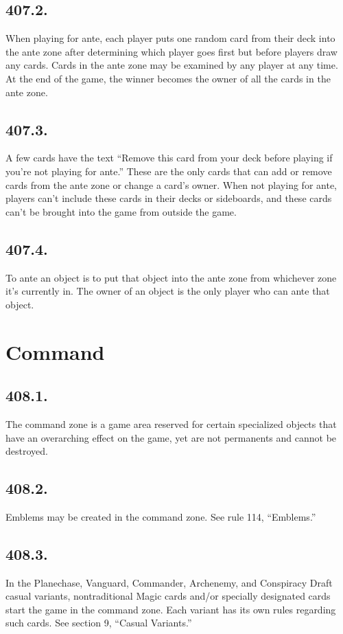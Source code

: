 \subsection*{407.2.}
When playing for ante, each player puts one random card from their deck into the ante zone after determining which player goes first but before players draw any cards. Cards in the ante zone may be examined by any player at any time. At the end of the game, the winner becomes the owner of all the cards in the ante zone.

\subsection*{407.3.}
A few cards have the text “Remove this card from your deck before playing if you’re not playing for ante.” These are the only cards that can add or remove cards from the ante zone or change a card’s owner. When not playing for ante, players can’t include these cards in their decks or sideboards, and these cards can’t be brought into the game from outside the game.

\subsection*{407.4.}
To ante an object is to put that object into the ante zone from whichever zone it’s currently in. The owner of an object is the only player who can ante that object.

\section{Command}
\subsection*{408.1.}
The command zone is a game area reserved for certain specialized objects that have an overarching effect on the game, yet are not permanents and cannot be destroyed.

\subsection*{408.2.}
Emblems may be created in the command zone. See rule 114, “Emblems.”

\subsection*{408.3.}
In the Planechase, Vanguard, Commander, Archenemy, and Conspiracy Draft casual variants, nontraditional Magic cards and/or specially designated cards start the game in the command zone. Each variant has its own rules regarding such cards. See section 9, “Casual Variants.”

